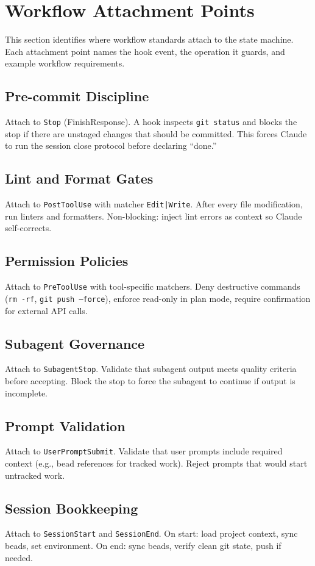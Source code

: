\documentclass[a4paper,10pt,fleqn]{article}
\begin{document}
\section{Workflow Attachment Points}

This section identifies where workflow standards attach to the state
machine. Each attachment point names the hook event, the operation it
guards, and example workflow requirements.

\subsection{Pre-commit Discipline}

Attach to \texttt{Stop} (FinishResponse). A hook inspects
\texttt{git status} and blocks the stop if there are unstaged changes
that should be committed. This forces Claude to run the session close
protocol before declaring ``done.''

\subsection{Lint and Format Gates}

Attach to \texttt{PostToolUse} with matcher \texttt{Edit|Write}. After
every file modification, run linters and formatters. Non-blocking: inject
lint errors as context so Claude self-corrects.

\subsection{Permission Policies}

Attach to \texttt{PreToolUse} with tool-specific matchers. Deny
destructive commands (\texttt{rm -rf}, \texttt{git push --force}),
enforce read-only in plan mode, require confirmation for external API
calls.

\subsection{Subagent Governance}

Attach to \texttt{SubagentStop}. Validate that subagent output meets
quality criteria before accepting. Block the stop to force the subagent
to continue if output is incomplete.

\subsection{Prompt Validation}

Attach to \texttt{UserPromptSubmit}. Validate that user prompts include
required context (e.g., bead references for tracked work). Reject prompts
that would start untracked work.

\subsection{Session Bookkeeping}

Attach to \texttt{SessionStart} and \texttt{SessionEnd}. On start: load
project context, sync beads, set environment. On end: sync beads, verify
clean git state, push if needed.
\end{document}
